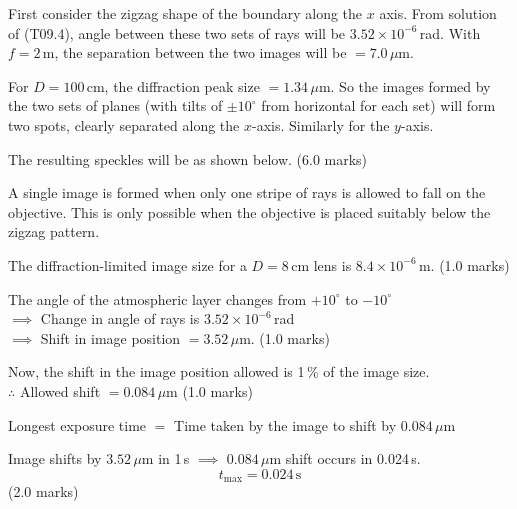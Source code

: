 \begin{description}
First consider the zigzag shape of the boundary along the $x$ axis. From
solution of (T09.4), angle between these two sets of rays will be
$3.52 \times 10^{-6}$\,rad. With $f = 2$\,m, the separation between the two
images will be $= 7.0\,\mu\mathrm{m}$.

For $D = 100$\,cm, the diffraction peak size $= 1.34\,\mu\mathrm{m}$. So
the images formed by the two sets of planes (with tilts of $\pm 10^\circ$
from horizontal for each set) will form two spots, clearly separated along
the $x$-axis. Similarly for the $y$-axis.

The resulting speckles will be as shown below. \hfill(6.0 marks)

\item[(T09.6)]
A single image is formed when only one stripe of rays is allowed to fall on
the objective. This is only possible when the objective is placed suitably
below the zigzag pattern.

The diffraction-limited image size for a $D = 8$\,cm lens is
$8.4 \times 10^{-6}$\,m. \hfill(1.0 marks)

The angle of the atmospheric layer changes from $+10^\circ$ to $-10^\circ$\\
$\implies$ Change in angle of rays is $3.52 \times 10^{-6}$\,rad\\
$\implies$ Shift in image position $= 3.52\,\mu\mathrm{m}$.
\hfill(1.0 marks)

Now, the shift in the image position allowed is 1\,\% of the image size.\\
$\therefore$ Allowed shift $= 0.084\,\mu\mathrm{m}$ \hfill(1.0 marks)

Longest exposure time $=$ Time taken by the image to shift by
$0.084\,\mu\mathrm{m}$

Image shifts by $3.52\,\mu\mathrm{m}$ in 1\,s $\implies$
$0.084\,\mu\mathrm{m}$ shift occurs in 0.024\,s.
\[ t_{\mathrm{max}} = 0.024\,\mathrm{s} \]
\hfill(2.0 marks)
\end{description}

